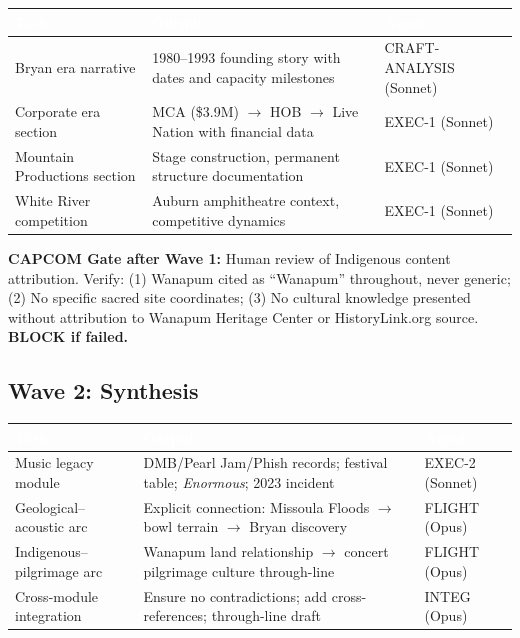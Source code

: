 \documentclass[11pt,letterpaper]{article}
\newcommand{\tableheader}[1]{\textbf{\sffamily\textcolor{white}{#1}}}
\begin{document}
\begin{center}
\begin{tabularx}{\textwidth}{L{3cm}XC{2cm}}
\toprule
{}
\tableheader{Task} & \tableheader{Output} & \tableheader{Agent} \\
\midrule
Bryan era narrative & 1980--1993 founding story with dates and capacity milestones & CRAFT-ANALYSIS (Sonnet) \\
Corporate era section & MCA (\$3.9M) $\to$ HOB $\to$ Live Nation with financial data & EXEC-1 (Sonnet) \\
Mountain Productions section & Stage construction, permanent structure documentation & EXEC-1 (Sonnet) \\
White River competition & Auburn amphitheatre context, competitive dynamics & EXEC-1 (Sonnet) \\
\bottomrule
\end{tabularx}
\end{center}

\textbf{CAPCOM Gate after Wave 1:} Human review of Indigenous content attribution. Verify: (1) Wanapum cited as ``Wanapum'' throughout, never generic; (2) No specific sacred site coordinates; (3) No cultural knowledge presented without attribution to Wanapum Heritage Center or HistoryLink.org source. \textbf{BLOCK if failed.}

\subsection{Wave 2: Synthesis}

\begin{center}
\begin{tabularx}{\textwidth}{L{3.5cm}XC{2cm}}
\toprule
{}
\tableheader{Task} & \tableheader{Output} & \tableheader{Agent} \\
\midrule
Music legacy module & DMB/Pearl Jam/Phish records; festival table; \textit{Enormous}; 2023 incident & EXEC-2 (Sonnet) \\
Geological--acoustic arc & Explicit connection: Missoula Floods $\to$ bowl terrain $\to$ Bryan discovery & FLIGHT (Opus) \\
Indigenous--pilgrimage arc & Wanapum land relationship $\to$ concert pilgrimage culture through-line & FLIGHT (Opus) \\
Cross-module integration & Ensure no contradictions; add cross-references; through-line draft & INTEG (Opus) \\
\bottomrule
\end{tabularx}
\end{center}
\end{document}
